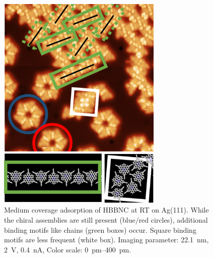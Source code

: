 \begin{figure}[] \centering
	\includegraphics[width=0.7\textwidth]{./images/hbbnc-ag-111-rt-med-coverage-3}
	\caption{Medium coverage adsorption of HBBNC at RT on Ag(111). While the chiral assemblies are still present (blue/red circles), additional binding motifs like chains (green boxes) occur. Square  binding motifs are less frequent (white box). Imaging parameter: \SI{22.1}{\nano \meter}, \SI{2}{\volt}, \SI{0.4}{\nano \ampere}, Color scale: \SIrange{0}{400}{\pico \meter}.}
	\label{fig:HBBNC-medium-coverage-different-motifs}
\end{figure}

